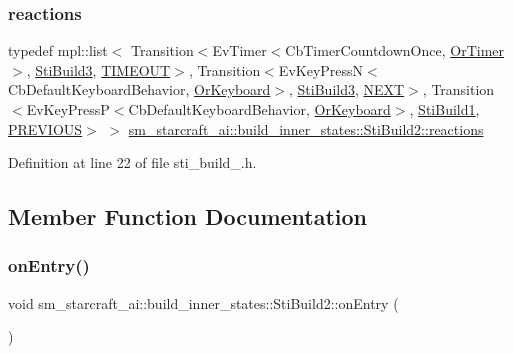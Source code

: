 \subsubsection{\texorpdfstring{reactions}{reactions}}
{\footnotesize\ttfamily typedef mpl\+::list$<$ Transition$<$Ev\+Timer$<$Cb\+Timer\+Countdown\+Once, \hyperlink{classsm__starcraft__ai_1_1OrTimer}{Or\+Timer}$>$, \hyperlink{structsm__starcraft__ai_1_1build__inner__states_1_1StiBuild3}{Sti\+Build3}, \hyperlink{structsm__starcraft__ai_1_1build__inner__states_1_1StiBuild2_1_1TIMEOUT}{T\+I\+M\+E\+O\+UT}$>$, Transition$<$Ev\+Key\+PressN$<$Cb\+Default\+Keyboard\+Behavior, \hyperlink{classsm__starcraft__ai_1_1OrKeyboard}{Or\+Keyboard}$>$, \hyperlink{structsm__starcraft__ai_1_1build__inner__states_1_1StiBuild3}{Sti\+Build3}, \hyperlink{structsm__starcraft__ai_1_1build__inner__states_1_1StiBuild2_1_1NEXT}{N\+E\+XT}$>$, Transition$<$Ev\+Key\+PressP$<$Cb\+Default\+Keyboard\+Behavior, \hyperlink{classsm__starcraft__ai_1_1OrKeyboard}{Or\+Keyboard}$>$, \hyperlink{structsm__starcraft__ai_1_1build__inner__states_1_1StiBuild1}{Sti\+Build1}, \hyperlink{structsm__starcraft__ai_1_1build__inner__states_1_1StiBuild2_1_1PREVIOUS}{P\+R\+E\+V\+I\+O\+US}$>$ $>$ \hyperlink{structsm__starcraft__ai_1_1build__inner__states_1_1StiBuild2_ab615bc2995682a7a80cdf4d5ddcad22c}{sm\+\_\+starcraft\+\_\+ai\+::build\+\_\+inner\+\_\+states\+::\+Sti\+Build2\+::reactions}}



Definition at line 22 of file sti\+\_\+build\+\_.\+h.



\subsection{Member Function Documentation}
\mbox{\label{structsm__starcraft__ai_1_1build__inner__states_1_1StiBuild2_aac67681e26987ca8d4bf57e9e561dae7}} 
\subsubsection{\texorpdfstring{on\+Entry()}{onEntry()}}
{\footnotesize\ttfamily void sm\+\_\+starcraft\+\_\+ai\+::build\+\_\+inner\+\_\+states\+::\+Sti\+Build2\+::on\+Entry (\begin{DoxyParamCaption}{ }\end{DoxyParamCaption})\hspace{0.3cm}{\ttfamily [inline]}}



